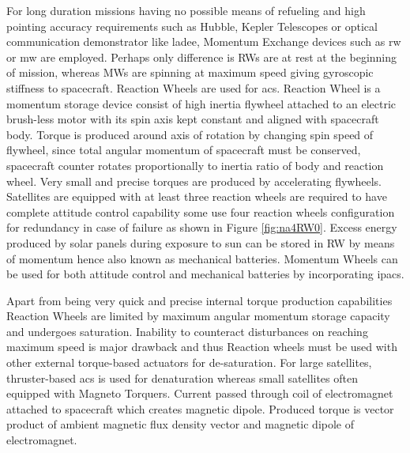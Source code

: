 For long duration missions having no possible means of refueling and high pointing accuracy requirements such as Hubble, Kepler Telescopes or optical communication demonstrator like \acrfull{ladee}, Momentum Exchange devices such as \acrfull{rw} or \acrfull{mw} are employed. Perhaps only difference is RWs are at rest at the beginning of mission, whereas MWs are spinning at maximum speed giving gyroscopic stiffness to spacecraft.
Reaction Wheels are used for \acrshort{acs}. Reaction Wheel is a momentum storage device consist of high inertia flywheel attached to an electric brush-less motor with its spin axis kept constant and aligned with spacecraft body. Torque is produced around axis of rotation by changing spin speed of flywheel, since total angular momentum of spacecraft must be conserved, spacecraft counter rotates proportionally to inertia ratio of body and reaction wheel. Very small and precise torques are produced by accelerating flywheels. Satellites are equipped with at least three reaction wheels are required to have complete attitude control capability some use four reaction wheels configuration for redundancy in case of failure as shown in Figure \ref{fig:na4RW0}. Excess energy produced by solar panels during exposure to sun can be stored in RW by means of momentum hence also known as mechanical batteries. Momentum Wheels can be used for both attitude control and mechanical batteries by incorporating \acrfull{ipacs}. \cite{TsiotrasPowerTracking} 

Apart from being very quick and precise internal torque production capabilities Reaction Wheels are limited by maximum angular momentum storage capacity and undergoes saturation. Inability to counteract disturbances on reaching maximum speed is major drawback and thus Reaction wheels must be used with other external torque-based actuators for de-saturation. For large satellites, thruster-based \acrshort{acs} is used for denaturation whereas small satellites often equipped with Magneto Torquers. Current passed through coil of electromagnet attached to spacecraft which creates magnetic dipole. Produced torque is vector product of ambient magnetic flux density vector and magnetic dipole of electromagnet.


